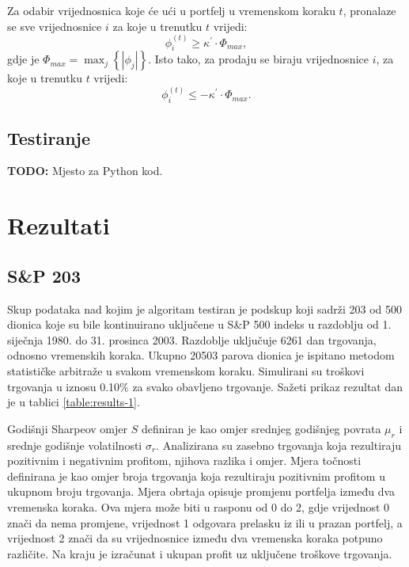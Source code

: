 \documentclass[lmodern, utf8, diplomski, numeric]{fer}
\newcommand{\todo}{\textbf{TODO: }}
\newcommand{\q}{\left}
\newcommand{\w}{\right}
\begin{document}
  Za odabir vrijednosnica koje će ući u portfelj u vremenskom koraku $t$, pronalaze se sve vrijednosnice $i$ za koje u trenutku $t$ vrijedi:
  \begin{equation*}
  \phi_i^{\q(t\w)} \ge \kappa^\prime \cdot \Phi_\mathit{max},
  \end{equation*}
  gdje je $\Phi_\mathit{max} = \max_j \q\{ \q\lvert \phi_j \w\rvert \w\}$.
  Isto tako, za prodaju se biraju vrijednosnice $i$, za koje u trenutku $t$ vrijedi:
  \begin{equation*}
  \phi_i^{\q(t\w)} \le -\kappa^\prime \cdot \Phi_\mathit{max}.
  \end{equation*}

  \section{Testiranje}
  \todo
  Mjesto za Python kod.
  
  \chapter{Rezultati}
  \section{S\&P 203}
  Skup podataka nad kojim je algoritam testiran je podskup koji sadrži 203 od 500 dionica koje su bile kontinuirano uključene u S\&P 500 indeks u razdoblju od 1. siječnja 1980. do 31. prosinca 2003.
  Razdoblje uključuje 6261 dan trgovanja, odnosno vremenskih koraka.
  Ukupno 20503 parova dionica je ispitano metodom statističke arbitraže u svakom vremenskom koraku.
  Simulirani su troškovi trgovanja u iznosu 0.10\% za svako obavljeno trgovanje.
  Sažeti prikaz rezultat dan je u tablici \ref{table:results-1}.
  
  Godišnji Sharpeov omjer $S$ definiran je kao omjer srednjeg godišnjeg povrata $\mu_r$ i srednje godišnje volatilnosti $\sigma_r$.
  Analizirana su zasebno trgovanja koja rezultiraju pozitivnim i negativnim profitom, njihova razlika i omjer.
  Mjera točnosti definirana je kao omjer broja trgovanja koja rezultiraju pozitivnim profitom u ukupnom broju trgovanja.
  Mjera obrtaja  opisuje promjenu portfelja između dva vremenska koraka.
  Ova mjera može biti u rasponu od 0 do 2, gdje vrijednost 0 znači da nema promjene, vrijednost 1 odgovara prelasku iz ili u prazan portfelj, a vrijednost 2 znači da su vrijednosnice između dva vremenska koraka potpuno različite.
  Na kraju je izračunat i ukupan profit uz uključene troškove trgovanja.
  
\end{document}
